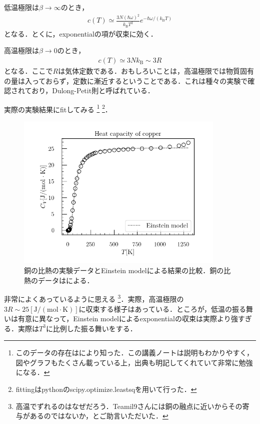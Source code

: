 	低温極限は$\beta \to \infty$のとき，
	\begin{align}
			c(T) \simeq \frac{3N(\hbar\omega)^2}{k_{\text{B}}T^2}e^{-\hbar\omega/(k_{\text{B}}T)} \label{einstein_low}
	\end{align}
	となる．とくに，exponentialの項が収束に効く．

	高温極限は$\beta \to 0$のとき，
	\begin{align}
			c(T) \simeq 3Nk_{\text{B}} \sim 3R \label{einstein_high}
	\end{align}
	となる．ここで$R$は気体定数である．おもしろいことは，高温極限では物質固有の量は入っておらず，定数に漸近するということである．これは種々の実験で確認されており，Dulong-Petit則と呼ばれている．

	実際の実験結果にfitしてみる
	\footnote{
			このデータの存在は\cite{ino_condmat}により知った．この講義ノートは説明もわかりやすく，図やグラフもたくさん載っている上，出典も明記してくれていて非常に勉強になる．
	}
	\footnote{
			fittingはpythonのscipy.optimize.leastsqを用いて行った．
	}．
	\begin{figure}[H]
			\centering
			\includegraphics[width=10cm]{./img/einstein_model_copper.png}
			\caption{銅の比熱の実験データとEinstein modelによる結果の比較．銅の比熱のデータは\cite{heat_WC}による．}
			\label{fig:einstein}
	\end{figure}
	非常によくあっているように思える
	\footnote{
			高温でずれるのはなぜだろう．Teamil9さんには銅の融点に近いからその寄与があるのではないか，とご助言いただいた．
	}．実際，高温極限の$3R\sim 25[\mathrm{J/(mol\cdot K)}]$に収束する様子はあっている．ところが，低温の振る舞いは有意に異なって，Einstein modelによるexponentialの収束は実際より強すぎる．実際は$T^3$に比例した振る舞いをする．
